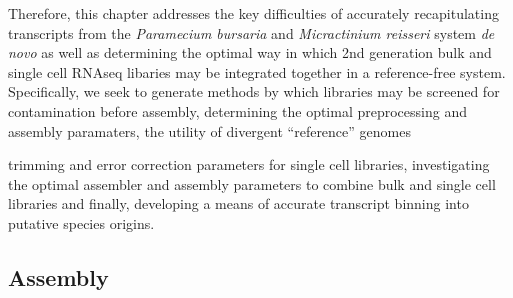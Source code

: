 



Therefore, this chapter addresses the key difficulties of accurately recapitulating transcripts from the \textit{Paramecium bursaria}
and \textit{Micractinium reisseri} system \textit{de novo} as well as 
determining the optimal way in which 2nd generation bulk and single cell RNAseq libaries may be integrated together in a reference-free
system.
Specifically, we seek to generate methods by which libraries may be screened for contamination before assembly, 
determining the optimal preprocessing and assembly paramaters, the utility of divergent ``reference'' genomes 


trimming and error correction parameters for single cell libraries, investigating the optimal
assembler and assembly parameters to combine bulk and single cell libraries and finally,
developing a means of accurate transcript binning into putative species origins.


\subsection{Assembly}

